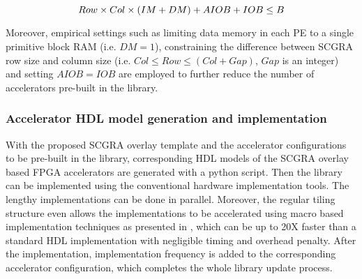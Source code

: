 \begin{equation} \label{eq:lib-gen}
    \footnotesize
    Row \times Col \times(IM + DM) + AIOB + IOB \leq B
\end{equation}

Moreover, empirical settings such as limiting data memory in each PE to a single primitive block RAM
(i.e. $DM = 1$), constraining the difference between SCGRA row size and column size (i.e. $Col \leq
Row \leq (Col + Gap)$, $Gap$ is an integer) and setting $AIOB = IOB$ are employed to further reduce the number of
accelerators pre-built in the library.  

\subsubsection{Accelerator HDL model generation and implementation}
With the proposed SCGRA overlay template and the accelerator configurations to be pre-built in the
library, corresponding HDL models of the SCGRA overlay based FPGA accelerators are generated with a
python script. Then the library can be implemented using the conventional hardware implementation
tools. The lengthy implementations can be done in parallel. Moreover, the regular tiling structure
even allows the implementations to be accelerated using macro based implementation techniques as
presented in \cite{ROB2015}, which can be up to 20X faster than a standard HDL implementation with
negligible timing and overhead penalty. After the implementation, implementation frequency is
added to the corresponding accelerator configuration, which completes the whole library update process.

